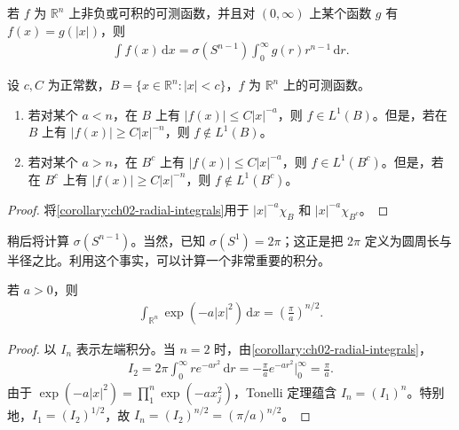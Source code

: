 \documentclass[../../main.tex]{subfiles}%
\begin{document}
\begin{corollary}\label{corollary:ch02-radial-integrals}
若 $f$ 为 $\mathbb{R}^n$ 上非负或可积的可测函数，并且对 $(0,\infty)$ 上某个函数 $g$ 有 $f(x)=g(|x|)$，则
\begin{align*}
\int f(x)\,\mathrm{d}x=\sigma(S^{n-1})\int_0^\infty g(r)r^{n-1}\,\mathrm{d}r.
\end{align*}
\end{corollary}
\begin{corollary}\label{corollary:ch02-power-integrability}
设 $c,C$ 为正常数，$B=\{x\in\mathbb{R}^n:|x|<c\}$，$f$ 为 $\mathbb{R}^n$ 上的可测函数。
\begin{enumerate}
\item\label{item:ch02-power-integrability-origin} 若对某个 $a<n$，在 $B$ 上有 $|f(x)|\le C|x|^{-a}$，则 $f\in L^1(B)$。但是，若在 $B$ 上有 $|f(x)|\ge C|x|^{-n}$，则 $f\notin L^1(B)$。
\item\label{item:ch02-power-integrability-infinity} 若对某个 $a>n$，在 $B^c$ 上有 $|f(x)|\le C|x|^{-a}$，则 $f\in L^1(B^c)$。但是，若在 $B^c$ 上有 $|f(x)|\ge C|x|^{-n}$，则 $f\notin L^1(B^c)$。
\end{enumerate}
\end{corollary}
\begin{proof}
将\cref{corollary:ch02-radial-integrals}用于 $|x|^{-a}\chi_B$ 和 $|x|^{-a}\chi_{B^c}$。
\end{proof}
稍后将计算 $\sigma(S^{n-1})$。当然，已知 $\sigma(S^1)=2\pi$；这正是把 $2\pi$ 定义为圆周长与半径之比。利用这个事实，可以计算一个非常重要的积分。
\begin{proposition}\label{proposition:ch02-gaussian-integral}
若 $a>0$，则
\begin{align*}
\int_{\mathbb{R}^n}\exp(-a|x|^2)\,\mathrm{d}x=\left(\frac\pi a\right)^{n/2}.
\end{align*}
\end{proposition}
\begin{proof}
以 $I_n$ 表示左端积分。当 $n=2$ 时，由\cref{corollary:ch02-radial-integrals}，
\begin{align*}
I_2=2\pi\int_0^\infty re^{-ar^2}\,\mathrm{d}r
=-\frac\pi a e^{-ar^2}\Big|_0^\infty=\frac\pi a.
\end{align*}
由于 $\exp(-a|x|^2)=\prod_1^n\exp(-ax_j^2)$，Tonelli 定理蕴含 $I_n=(I_1)^n$。特别地，$I_1=(I_2)^{1/2}$，故 $I_n=(I_2)^{n/2}=(\pi/a)^{n/2}$。
\end{proof}
\end{document}
